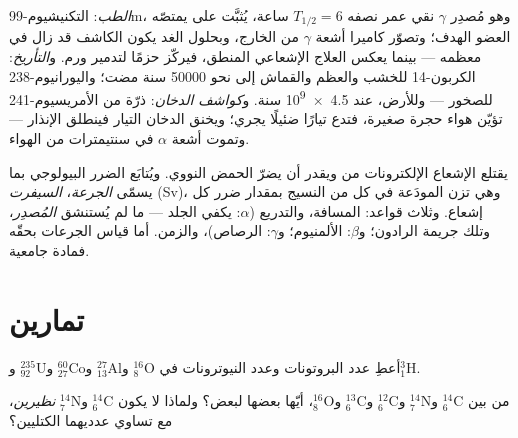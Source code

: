\begin{example}\label{ex:g11:nucleus-radioactivity:uses}
\emph{الطب}: التكنيشيوم-99m، وهو مُصدِر $\gamma$ نقي عمر نصفه
$T_{1/2} = 6$ ساعة، يُثبَّت على  يمتصّه العضو الهدف؛ وتصوّر
كاميرا أشعة $\gamma$ من الخارج، وبحلول الغد يكون الكاشف قد
زال في معظمه --- بينما يعكس العلاج الإشعاعي المنطق، فيركّز حزمًا
لتدمير ورم. و\emph{التأريخ}: الكربون-14 للخشب والعظم والقماش إلى
نحو \num{50000} سنة مضت؛ واليورانيوم-238 للصخور --- وللأرض، عند
\num{4.5e9} سنة. و\emph{كواشف الدخان}: ذرّة من الأمريسيوم-241 تؤيّن
هواء حجرة صغيرة، فتدع تيارًا ضئيلًا يجري؛ ويخنق الدخان
التيار فينطلق الإنذار --- وتموت أشعة $\alpha$ في سنتيمترات من الهواء.
\end{example}

\begin{remark}\label{rem:g11:nucleus-radioactivity:dose}
يقتلع الإشعاع الإلكترونات من  ويقدر أن يضرّ الحمض النووي. ويُتابَع
الضرر البيولوجي بما يسمّى \emph{الجرعة}، 
\emph{السيفرت} (\unit{Sv})، وهي
تزن  المودَعة في كل  من النسيج بمقدار ضرر كل
إشعاع. وثلاث قواعد: المسافة، والتدريع ($\alpha$: يكفي الجلد ---
ما لم يُستنشق \emph{المُصدِر}، وتلك جريمة الرادون؛ و$\beta$: الألمنيوم؛
و$\gamma$: الرصاص)، والزمن. أما قياس الجرعات بحقّه فمادة جامعية.
\end{remark}

\section{تمارين}

\begin{exercise}[$\star$]\label{exo:g11:nucleus-radioactivity:1}
أعطِ عدد البروتونات وعدد النيوترونات في ${}^{16}_{8}\mathrm{O}$
و${}^{27}_{13}\mathrm{Al}$ و${}^{60}_{27}\mathrm{Co}$ و${}^{235}_{92}\mathrm{U}$
و${}^{3}_{1}\mathrm{H}$.
\end{exercise}

\begin{exercise}[$\star$]\label{exo:g11:nucleus-radioactivity:2}
من بين ${}^{14}_{6}\mathrm{C}$ و${}^{14}_{7}\mathrm{N}$ و${}^{12}_{6}\mathrm{C}$
و${}^{13}_{6}\mathrm{C}$ و${}^{16}_{8}\mathrm{O}$، أيّها 
بعضها لبعض؟ ولماذا لا يكون ${}^{14}_{6}\mathrm{C}$ و${}^{14}_{7}\mathrm{N}$
\emph{نظيرين}، مع تساوي عدديهما الكتليين؟
\end{exercise}

